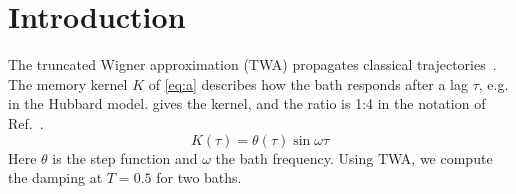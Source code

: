 \documentclass{article}
\begin{document}
\section{Introduction}

The truncated Wigner approximation (TWA) propagates classical trajectories~\cite{P2010}.
The memory kernel $K$ of \cref{eq:a} describes how the bath responds after a lag $\tau$, e.g. in the Hubbard model.
 gives the kernel, and the ratio is 1:4 in the notation of Ref.~\cite{X}.
\begin{equation}
  K(\tau)=\theta(\tau)\sin\omega\tau \label{eq:a}
\end{equation}
Here $\theta$ is the step function and $\omega$ the bath frequency.
Using TWA, we compute the damping at $T=0.5$ for two baths.
\end{document}
